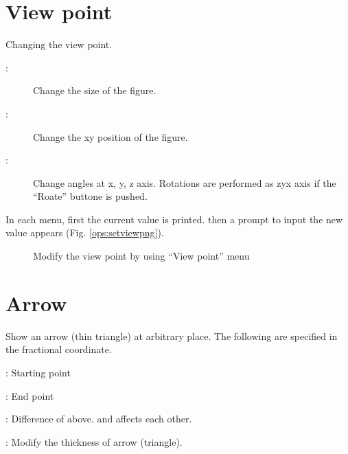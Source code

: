 \documentclass[letterpaper,10pt,pdftex,openany,english]{sphinxmanual}
\let\sphinxpxdimen\pdfpxdimen\else\newdimen\sphinxpxdimen
\begin{document}
\section{View point}
\label{\detokenize{ops:view-point}}
\sphinxAtStartPar
Changing the view point.
\begin{description}
\item[{ :}] \leavevmode
\sphinxAtStartPar
Change the size of the figure.

\item[{ :}] \leavevmode
\sphinxAtStartPar
Change the xy position of the figure.

\item[{ :}] \leavevmode
\sphinxAtStartPar
Change angles at x\sphinxhyphen{}, y\sphinxhyphen{}, z\sphinxhyphen{} axis.
Rotations are performed as z\sphinxhyphen{}y\sphinxhyphen{}x axis if the “Roate” buttone is pushed.

\end{description}

\sphinxAtStartPar
In each menu, first the current value is printed. then a prompt to input
the new value appears (Fig. \ref{ops:setviewpng}).

\begin{figure}[htbp]
\centering
\capstart

\noindent\sphinxincludegraphics[width=300\sphinxpxdimen]{{setview}.png}
\caption{Modify the view point by using “View point” menu}\label{\detokenize{ops:id12}}\label{\detokenize{ops:setviewpng}}\end{figure}


\section{Arrow}
\label{\detokenize{ops:arrow}}
\sphinxAtStartPar
Show an arrow (thin triangle) at arbitrary place.
The following are specified in the fractional coordinate.

\sphinxAtStartPar
{} : Starting point

\sphinxAtStartPar
{} : End point

\sphinxAtStartPar
{} : Difference of above.  and  affects each other.

\sphinxAtStartPar
{} : Modify the thickness of arrow (triangle).
\end{document}
